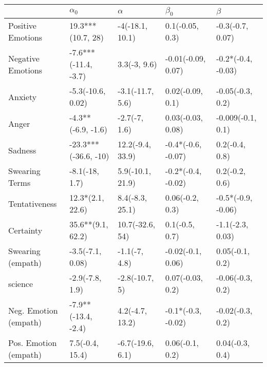 \begin{tabular}{lllll}
\toprule
{} &            $\alpha_0$ &          $\alpha$ &           $\beta_0$ &             $\beta$ \\
\midrule
Positive Emotions     &     19.3***(10.7, 28) &   -4(-18.1, 10.1) &     0.1(-0.05, 0.3) &    -0.3(-0.7, 0.07) \\
Negative Emotions     &  -7.6***(-11.4, -3.7) &      3.3(-3, 9.6) &  -0.01(-0.09, 0.07) &  -0.2*(-0.4, -0.03) \\
Anxiety               &     -5.3(-10.6, 0.02) &  -3.1(-11.7, 5.6) &    0.02(-0.09, 0.1) &    -0.05(-0.3, 0.2) \\
Anger                 &    -4.3**(-6.9, -1.6) &     -2.7(-7, 1.6) &   0.03(-0.03, 0.08) &   -0.009(-0.1, 0.1) \\
Sadness               &  -23.3***(-36.6, -10) &  12.2(-9.4, 33.9) &  -0.4*(-0.6, -0.07) &      0.2(-0.4, 0.8) \\
Swearing Terms        &        -8.1(-18, 1.7) &  5.9(-10.1, 21.9) &  -0.2*(-0.4, -0.02) &      0.2(-0.2, 0.6) \\
Tentativeness         &      12.3*(2.1, 22.6) &   8.4(-8.3, 25.1) &     0.06(-0.2, 0.3) &  -0.5*(-0.9, -0.06) \\
Certainty             &     35.6**(9.1, 62.2) &   10.7(-32.6, 54) &      0.1(-0.5, 0.7) &    -1.1(-2.3, 0.03) \\
Swearing (empath)     &      -3.5(-7.1, 0.08) &     -1.1(-7, 4.8) &   -0.02(-0.1, 0.06) &     0.05(-0.1, 0.2) \\
science               &       -2.9(-7.8, 1.9) &    -2.8(-10.7, 5) &    0.07(-0.03, 0.2) &    -0.06(-0.3, 0.2) \\
Neg. Emotion (empath) &   -7.9**(-13.4, -2.4) &   4.2(-4.7, 13.2) &  -0.1*(-0.3, -0.02) &    -0.02(-0.3, 0.2) \\
Pos. Emotion (empath) &       7.5(-0.4, 15.4) &  -6.7(-19.6, 6.1) &     0.06(-0.1, 0.2) &     0.04(-0.3, 0.4) \\
\bottomrule
\end{tabular}
